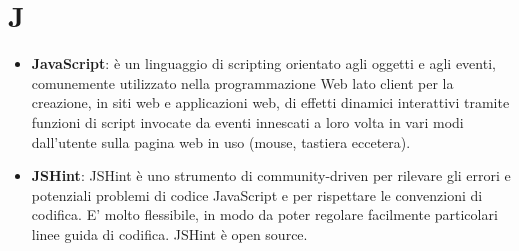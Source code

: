 \section{J}
\begin{itemize} 
	\item
	\textbf{JavaScript}:  è un linguaggio di scripting orientato agli oggetti e agli eventi, comunemente utilizzato nella programmazione Web lato client per la creazione, in siti web e applicazioni web, di effetti dinamici interattivi tramite funzioni di script invocate da eventi innescati a loro volta in vari modi dall'utente sulla pagina web in uso (mouse, tastiera eccetera).
	\item
	\textbf{JSHint}: JSHint è uno strumento di community-driven per rilevare gli errori e potenziali problemi di codice JavaScript e per rispettare le convenzioni di codifica. E' molto flessibile, in modo da poter regolare facilmente particolari linee guida di codifica. JSHint è open source.
\end{itemize}
